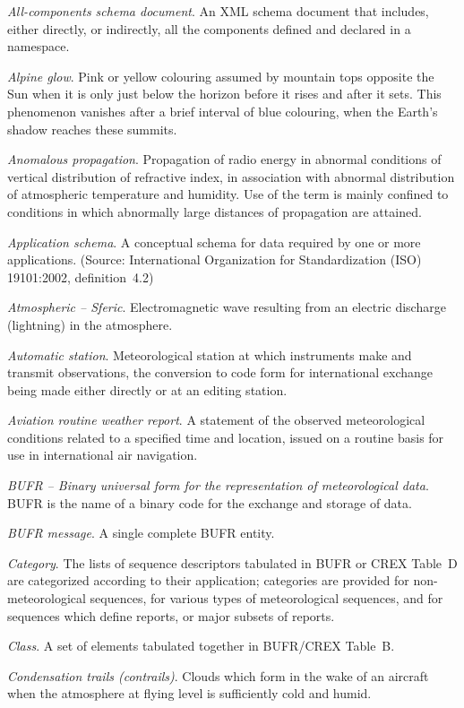 \emph{All-components schema document}. An XML schema document that includes, either directly, or indirectly, all the components defined and declared in a namespace.

\emph{Alpine glow}. Pink or yellow colouring assumed by mountain tops opposite the Sun when it is only just below the horizon before it rises and after it sets. This phenomenon vanishes after a brief interval of blue colouring, when the Earth's shadow reaches these summits.

\emph{Anomalous propagation}. Propagation of radio energy in abnormal conditions of vertical distribution of refractive index, in association with abnormal distribution of atmospheric temperature and humidity. Use of the term is mainly confined to conditions in which abnormally large distances of propagation are attained.

\emph{Application schema}. A conceptual schema for data required by one or more applications. (Source: International Organization for Standardization (ISO) 19101:2002, definition~4.2)

\emph{Atmospheric -- Sferic}. Electromagnetic wave resulting from an electric discharge (lightning) in the atmosphere.

\emph{Automatic station}. Meteorological station at which instruments make and transmit observations, the conversion to code form for international exchange being made either directly or at an editing station.

\emph{Aviation routine weather report}. A statement of the observed meteorological conditions related to a specified time and location, issued on a routine basis for use in international air navigation.

\emph{BUFR -- Binary universal form for the representation of meteorological data}. BUFR is the name of a binary code for the exchange and storage of data.

\emph{BUFR message}. A single complete BUFR entity.

\emph{Category}. The lists of sequence descriptors tabulated in BUFR or CREX Table~D are categorized according to their application; categories are provided for non-meteorological sequences, for various types of meteorological sequences, and for sequences which define reports, or major subsets of reports.

\emph{Class}. A set of elements tabulated together in BUFR/CREX Table~B.

\emph{Condensation trails (contrails)}. Clouds which form in the wake of an aircraft when the atmosphere at flying level is sufficiently cold and humid.

